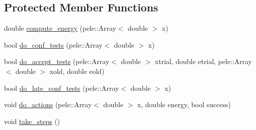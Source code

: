 \subsection*{\-Protected \-Member \-Functions}
\begin{DoxyCompactItemize}
\item 
double \hyperlink{classmcpele_1_1MC_ab0a769e799bccd46f1e290daf1f4698b}{compute\-\_\-energy} (pele\-::\-Array$<$ double $>$ x)
\item 
bool \hyperlink{classmcpele_1_1MC_a10c67bdbd29525b7cfe4c97f861e5b8f}{do\-\_\-conf\-\_\-tests} (pele\-::\-Array$<$ double $>$ x)
\item 
bool \hyperlink{classmcpele_1_1MC_ab122e2f3a32b409493043d62a2ad5806}{do\-\_\-accept\-\_\-tests} (pele\-::\-Array$<$ double $>$ xtrial, double etrial, pele\-::\-Array$<$ double $>$ xold, double eold)
\item 
bool \hyperlink{classmcpele_1_1MC_ac2f9ac6eaf22fff6d85e3a659658c3c2}{do\-\_\-late\-\_\-conf\-\_\-tests} (pele\-::\-Array$<$ double $>$ x)
\item 
void \hyperlink{classmcpele_1_1MC_afc4426d60374b2d941405d269eb214ed}{do\-\_\-actions} (pele\-::\-Array$<$ double $>$ x, double energy, bool success)
\item 
void \hyperlink{classmcpele_1_1MC_ac9f211c253a12cd3e6bed935a0c8c1f2}{take\-\_\-steps} ()
\end{DoxyCompactItemize}
